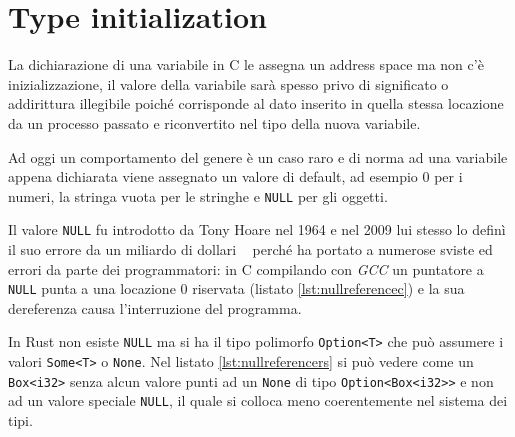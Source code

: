 \documentclass[Lau,binding=0.6cm]{sapthesis}
\newcommand{\textcode}[1]{\colorbox{backcolour}{\texttt{#1}}}
\begin{document}
 

\section{Type initialization} \label{sec:type_initialization}
La dichiarazione di una variabile in C le assegna un address space ma non c'è inizializzazione, il valore della variabile sarà spesso privo di significato o addirittura illegibile poiché corrisponde al dato inserito in quella stessa locazione da un processo passato e riconvertito nel tipo della nuova variabile.

Ad oggi un comportamento del genere è un caso raro e di norma ad una variabile appena dichiarata viene assegnato un valore di default, ad esempio $ 0 $ per i numeri, la stringa vuota per le stringhe e \textcode{NULL} per gli oggetti.

Il valore \textcode{NULL} fu introdotto da Tony Hoare nel 1964 e nel 2009 lui stesso lo definì il suo errore da un miliardo di dollari ~\cite{hoare:billion_dollar_mistake} perché ha portato a numerose sviste ed errori da parte dei programmatori: in C compilando con \textit{GCC} un puntatore a \textcode{NULL} punta a una locazione $ 0 $ riservata (listato \ref{lst:nullreferencec}) e la sua dereferenza causa l'interruzione del programma. 




In Rust non esiste \textcode{NULL} ma si ha il tipo polimorfo \textcode{Option<T>} che può assumere i valori \textcode{Some<T>} o \textcode{None}. 
Nel listato \ref{lst:nullreferencers} si può vedere come un \texttt{Box<i32>} senza alcun valore punti ad un \textcode{None} di tipo \textcode{Option<Box<i32>{}>} e non ad un valore speciale \textcode{NULL}, il quale si colloca meno coerentemente nel sistema dei tipi.



\end{document}
